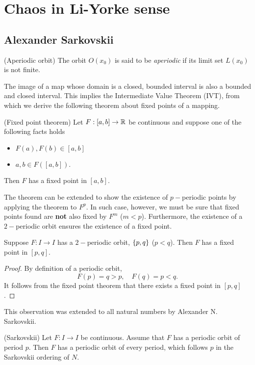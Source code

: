 \documentclass[11pt]{article}
\begin{document}
\section{Chaos in Li-Yorke sense}

\subsection{Alexander Sarkovskii}
\begin{definition}
  (Aperiodic orbit)
  The orbit $O(x_0)$ is said to be \textit{aperiodic} if its limit set $L(x_0)$ is not finite.
\end{definition}


The image of a map whose domain is a closed, bounded interval is also a bounded and closed interval.
This implies the Intermediate Value Theorem (IVT), from which we derive the following theorem about
fixed points of a mapping.
\begin{proposition}
  (Fixed point theorem)
  Let $F: [a,b] \to \mathbb{R}$ be continuous and suppose one of the following facts holds
  \begin{itemize}
    \item $F(a), F(b)\in [a,b]$
    \item $a, b\in F([a,b])$.
  \end{itemize}
  Then $F$ has a fixed point in $[a,b]$.
\end{proposition}

The theorem can be extended to show the existence of $p-$periodic points by applying the theorem to
$F^p$. In such case, however, we must be sure that fixed points found are \textbf{not} also fixed by
$F^m$ ($m < p$).
Furthermore, the existence of a $2-$periodic orbit ensures the existence of a fixed point.
\begin{proposition}
  Suppose $F: I\to I$ has a $2-$periodic orbit, $\{p,q\}$ ($p<q$). Then $F$ has a fixed point in $[p,q]$.
\end{proposition}
\begin{proof}
  By definition of a periodic orbit, 
  \begin{equation*}
    F(p) = q > p, \quad F(q) = p < q.
  \end{equation*}
  It follows from the fixed point theorem that there exists a fixed point in $[p,q]$.
\end{proof}

This observation was extended to all natural numbers by Alexander N. Sarkovskii.
\begin{proposition}
  (Sarkovskii)
  Let $F: I\to I$ be continuous. Assume that $F$ has a periodic orbit of period $p$.
  Then $F$ has a periodic orbit of every period, which follows $p$ in the Sarkovskii
  ordering of $N$.
\end{proposition}
\end{document}
